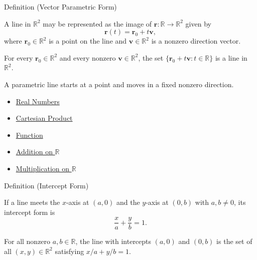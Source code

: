 \begin{definitionbox}{Definition (Vector Parametric Form)}
\begin{definition}\label{def:vector-parametric-form}
A line in $\mathbb{R}^2$ may be represented as the image of
$\mathbf r:\mathbb{R}\to\mathbb{R}^2$ given by
\[
  \mathbf r(t)=\mathbf r_0+t\mathbf v,
\]
where $\mathbf r_0\in\mathbb{R}^2$ is a point on the line and
$\mathbf v\in\mathbb{R}^2$ is a nonzero direction vector.
\end{definition}
\end{definitionbox}

\begin{remark*}
For every $\mathbf r_0\in\mathbb{R}^2$ and every nonzero
$\mathbf v\in\mathbb{R}^2$, the set
$\{\mathbf r_0+t\mathbf v:t\in\mathbb{R}\}$ is a line in $\mathbb{R}^2$.
\end{remark*}

\begin{remark*}[Interpretation]
A parametric line starts at a point and moves in a fixed nonzero direction.
\end{remark*}

\begin{dependencies}
\begin{itemize}
  \item \hyperref[def:reals]{Real Numbers}
  \item \hyperref[def:cartesian-product]{Cartesian Product}
  \item \hyperref[def:function]{Function}
  \item \hyperref[def:addition-on-r]{Addition on $\mathbb{R}$}
  \item \hyperref[def:multiplication-on-r]{Multiplication on $\mathbb{R}$}
\end{itemize}
\end{dependencies}

\begin{definitionbox}{Definition (Intercept Form)}
\begin{definition}\label{def:intercept-form}
If a line meets the $x$-axis at $(a,0)$ and the $y$-axis at $(0,b)$ with
$a,b\neq 0$, its intercept form is
\[
  \frac{x}{a}+\frac{y}{b}=1.
\]
\end{definition}
\end{definitionbox}

\begin{remark*}
For all nonzero $a,b\in\mathbb{R}$, the line with intercepts $(a,0)$ and
$(0,b)$ is the set of all $(x,y)\in\mathbb{R}^2$ satisfying
$x/a+y/b=1$.
\end{remark*}

